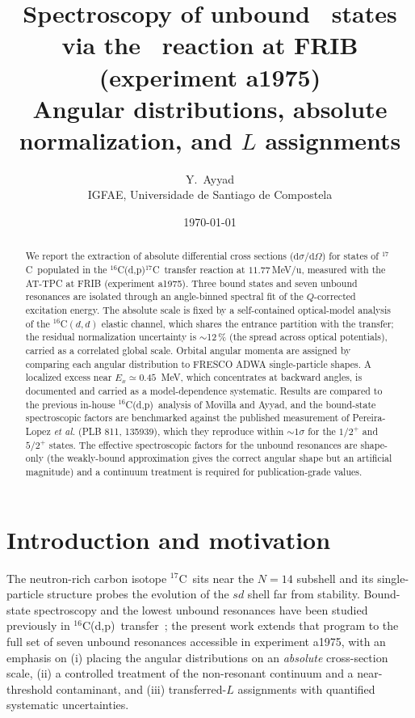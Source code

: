 \documentclass[11pt,a4paper]{article}
\title{\textbf{Spectroscopy of unbound \Cse\ states via the \Cs\dpr\Cse\
reaction at FRIB (experiment a1975)}\\[2pt]
\large Angular distributions, absolute normalization, and $L$ assignments}
\author{Y.~Ayyad\\
\small IGFAE, Universidade de Santiago de Compostela}
\date{\today}
\newcommand{\Cs}{$^{16}$C}
\newcommand{\Cse}{$^{17}$C}
\newcommand{\dpr}{(d,p)}
\newcommand{\mevu}{\,MeV/u}
\begin{document}
\maketitle

\begin{abstract}
\noindent
We report the extraction of absolute differential cross sections
($\mathrm{d}\sigma/\mathrm{d}\Omega$) for states of \Cse\ populated in the
\Cs\dpr\Cse\ transfer reaction at $11.77$\mevu, measured with the AT-TPC at
FRIB (experiment a1975). Three bound states and seven unbound resonances are
isolated through an angle-binned spectral fit of the $Q$-corrected excitation
energy. The absolute scale is fixed by a self-contained optical-model analysis
of the \Cs$(d,d)$ elastic channel, which shares the entrance partition with the
transfer; the residual normalization uncertainty is $\sim$12\,\% (the spread
across optical potentials), carried as a correlated global scale. Orbital
angular momenta are assigned by comparing each angular distribution to FRESCO
ADWA single-particle shapes. A localized excess near $E_x\simeq0.45$~MeV, which
concentrates at backward angles, is documented and carried as a model-dependence
systematic. Results are compared to the previous in-house \Cs\dpr\ analysis of
Movilla and Ayyad, and the bound-state spectroscopic factors are benchmarked
against the published measurement of Pereira-Lopez \textit{et al.} (PLB 811,
135939), which they reproduce within $\sim$$1\sigma$ for the $1/2^+$ and $5/2^+$
states. The effective spectroscopic factors for the unbound resonances are
shape-only (the weakly-bound approximation gives the correct angular shape but
an artificial magnitude) and a continuum treatment is required for
publication-grade values.
\end{abstract}

\tableofcontents

\section{Introduction and motivation}
\label{sec:intro}

The neutron-rich carbon isotope \Cse\ sits near the $N=14$ subshell and its
single-particle structure probes the evolution of the $sd$ shell far from
stability. Bound-state spectroscopy and the lowest unbound resonances have been
studied previously in \Cs\dpr\ transfer~\cite{PereiraLopez2020,MovillaAyyad2026};
the present work extends that program to the full set of seven unbound
resonances accessible in experiment a1975, with an emphasis on (i) placing the
angular distributions on an \emph{absolute} cross-section scale, (ii) a
controlled treatment of the non-resonant continuum and a near-threshold
contaminant, and (iii) transferred-$L$ assignments with quantified systematic
uncertainties.
\end{document}
